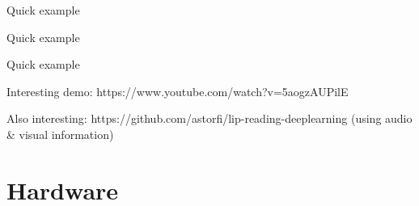\documentclass{beamer}
\begin{document}
	\begin{frame}{Quick example}
	\end{frame}
	\begin{frame}{Quick example}
		\centering
	\end{frame}
	\begin{frame}{Quick example}
		\centering
		
		Interesting demo: https://www.youtube.com/watch?v=5aogzAUPilE
		
		Also interesting: https://github.com/astorfi/lip-reading-deeplearning (using audio \& visual information)
	\end{frame}
	
	
	\section{Hardware}%
	
\end{document}
